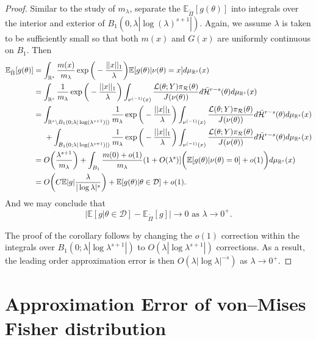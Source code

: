 \documentclass[10pt,fleqn]{article} \pdfoutput=1
\newcommand{\bb}[1]{\mathbb{#1}} \newcommand{\mc}[1]{\mathcal{#1}}
\DeclareMathOperator{\1}{\mathbbm{1}} \DeclareMathOperator{\bigO}{\mc O}
\begin{document}
\begin{proof}
Similar to the study of $m_\lambda$, separate the $\bb E_{\tilde{\Pi}}[g(\theta)]$ into integrals over the interior and exterior of $B_1(0,\lambda|\log(\lambda)^{s+1}|)$. Again, we assume $\lambda$ is taken to be sufficiently small so that both $m(x)$ and $G(x)$ are uniformly continuous on $B_1$. Then 
\begin{align*}
\bb E_{\tilde{\Pi}}[g(\theta)] &= \int_{\mathbb{R}^s} \frac{m(x)}{m_\lambda}\exp\bigg(-\frac{||x||_1}{\lambda}\bigg)\bb E[g(\theta)|\nu(\theta)=x]d\mu_{\mathbb{R}^s}(x) \\
&= \int_{\mathbb{R}^s} \frac{1}{m_\lambda}\exp\bigg(-\frac{||x||_1}{\lambda}\bigg)\int_{\nu^{(-1)}(x)} \frac{\mathcal{L}(\theta;Y)\pi_\mathcal{R}(\theta)}{J(\nu(\theta))}d\bar{\mathcal{H}}^{r-s}(\theta) d\mu_{\mathbb{R}^s}(x) \\
&=\int_{\mathbb{R}^s \setminus B_1(0;\lambda|\log(\lambda^{s+1})|)} \frac{1}{m_\lambda}\exp\bigg(-\frac{||x||_1}{\lambda}\bigg) \int_{\nu^{(-1)}(x)} \frac{\mathcal{L}(\theta;Y)\pi_\mathcal{R}(\theta)}{J(\nu(\theta))}d\bar{\mathcal{H}}^{r-s}(\theta) d\mu_{\mathbb{R}^s}(x) \\
&\hspace{0.5 cm} + \int_{B_1(0;\lambda|\log(\lambda^{s+1})|)} \frac{1}{m_\lambda}\exp\bigg(-\frac{||x||_1}{\lambda}\bigg) \int_{\nu^{(-1)}(x)} \frac{\mathcal{L}(\theta;Y)\pi_\mathcal{R}(\theta)}{J(\nu(\theta))}d\bar{\mathcal{H}}^{r-s}(\theta)  d\mu_{\mathbb{R}^s}(x) \\
&= O\bigg( \frac{\lambda^{s+1}}{m_\lambda} \bigg) + \int_{B_1} \frac{m(0)+o(1)}{m_\lambda}(1+O(\lambda^s)]\bigg(\bb E[g(\theta)|\nu(\theta)=0] + o(1) \bigg) d\mu_{\mathbb{R}^s}(x)  \\
&= O\bigg( C \bb E|g|\frac{\lambda}{|\log\lambda|^s}\bigg) + \bb E[g(\theta)|\theta \in \mathcal{D}] + o(1).
\end{align*}
And we may conclude that $$\bigg|\bb E[g|\theta\in\mathcal{D}] - \bb E_{\tilde{\Pi}}[g] \bigg| \to 0 \text{ as } \lambda\to0^+.$$

The proof of the corollary follows by changing the $o(1)$ correction within the integrals over $B_1(0;\lambda|\log \lambda^{s+1}|)$ to $O(\lambda |\log \lambda^{s+1}|)$ corrections.  As a result, the leading order approximation error is then $O(\lambda|\log \lambda|^{-s})$ as $\lambda\to 0^+.$
\end{proof}


\section{Approximation Error of von--Mises Fisher distribution}
\end{document}
